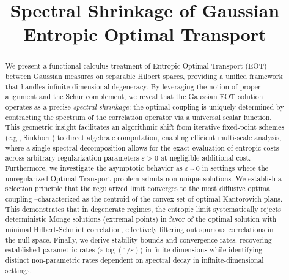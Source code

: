 \documentclass[noinfoline]{imsart}\setcounter{tocdepth}{2}
\theoremstyle{plain}
\begin{document}
\pagestyle{fancy}
\fancyhead{}
\renewcommand{\headrulewidth}{0pt} 

\begin{frontmatter}
\title{{\large Spectral Shrinkage of Gaussian Entropic Optimal Transport}}

\begin{aug}
\author[A]{ }

\address[A]{Ecole Polytechnique F\'ed\'erale de Lausanne, }
\end{aug}

\begin{abstract}
We present a functional calculus treatment of Entropic Optimal Transport (EOT) between Gaussian measures on separable Hilbert spaces, providing a unified framework that handles infinite-dimensional degeneracy. By leveraging the notion of proper alignment and the Schur complement, we reveal that the Gaussian EOT solution operates as a precise \textit{spectral shrinkage}: the optimal coupling is uniquely determined by contracting the spectrum of the correlation operator via a universal scalar function. This geometric insight facilitates an algorithmic shift from iterative fixed-point schemes (e.g., Sinkhorn) to direct algebraic computation, enabling efficient multi-scale analysis, where a single spectral decomposition allows for the exact evaluation of entropic costs across arbitrary regularization parameters $\varepsilon > 0$ at negligible additional cost. Furthermore, we investigate the asymptotic behavior as $\varepsilon \downarrow 0$ in settings where the unregularized Optimal Transport problem admits non-unique solutions. We establish a selection principle that the regularized limit converges to the most diffusive optimal coupling --characterized as the centroid of the convex set of optimal Kantorovich plans. This demonstrates that in degenerate regimes, the entropic limit systematically rejects deterministic Monge solutions (extremal points) in favor of the optimal solution with minimal Hilbert-Schmidt correlation, effectively filtering out spurious correlations in the null space. Finally, we derive stability bounds and convergence rates, recovering established parametric rates ($\varepsilon \log(1/\varepsilon)$) in finite dimensions while identifying distinct non-parametric rates dependent on spectral decay in infinite-dimensional settings.
\end{abstract}

\begin{keyword}[class=AMS]
\end{keyword}

\begin{keyword}
\end{keyword}
\end{frontmatter}
\end{document}
